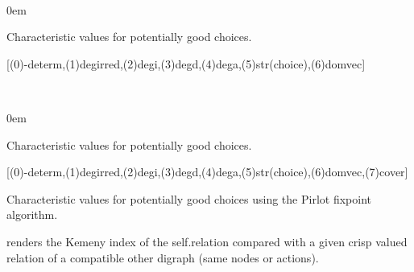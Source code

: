 \documentclass[letterpaper,10pt,english]{sphinxmanual}
\begin{document}
\begin{fulllineitems}
\begin{fulllineitems}
\end{fulllineitems}


\begin{fulllineitems}
\label{techDoc:digraphs.Digraph.computeGoodChoiceVector}~
\begin{DUlineblock}{0em}
\item[] Characteristic values for potentially good choices.
\item[] {[}(0)-determ,(1)degirred,(2)degi,(3)degd,(4)dega,(5)str(choice),(6)domvec{]}
\end{DUlineblock}

\end{fulllineitems}


\begin{fulllineitems}
\label{techDoc:digraphs.Digraph.computeGoodChoices}~
\begin{DUlineblock}{0em}
\item[] Characteristic values for potentially good choices.
\item[] {[}(0)-determ,(1)degirred,(2)degi,(3)degd,(4)dega,(5)str(choice),(6)domvec,(7)cover{]}
\end{DUlineblock}

\end{fulllineitems}


\begin{fulllineitems}
\label{techDoc:digraphs.Digraph.computeGoodPirlotChoices}
Characteristic values for potentially good choices
using the Pirlot fixpoint algorithm.

\end{fulllineitems}


\begin{fulllineitems}
\label{techDoc:digraphs.Digraph.computeKemenyIndex}
renders the Kemeny index of the self.relation
compared with a given crisp valued relation of a compatible
other digraph (same nodes or actions).


\end{fulllineitems}
\end{fulllineitems}
\end{document}
